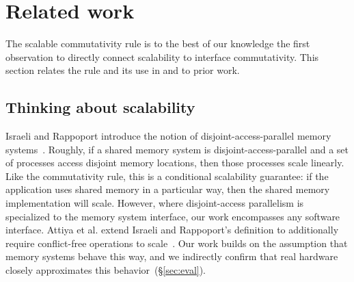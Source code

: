 
\section{Related work}
\label{sec:related}

The scalable commutativity rule is to the best of our knowledge the
first observation to directly connect scalability to interface
commutativity.
This section relates the rule and its use
in \sys and \tool to prior work.

\subsection{Thinking about scalability}

Israeli and Rappoport introduce the notion of disjoint-access-parallel
memory systems~\cite{israeli:disjoint-access}.  Roughly, if a shared memory system
is disjoint-access-parallel and a set of processes access disjoint memory
locations, then those processes scale linearly.  Like the commutativity rule,
this is a conditional scalability guarantee: if the application uses shared
memory in a particular way, then the shared memory implementation will scale.
However, where disjoint-access parallelism is specialized to the memory system
interface, our work encompasses any software interface.
%
Attiya et al. extend Israeli and Rappoport's definition to additionally require
conflict-free operations to scale~\cite{attiya:disjoint}.
%
Our work builds on the assumption that
memory systems behave this way, and we indirectly confirm that real hardware
closely approximates this behavior~(\S\ref{sec:eval}).



